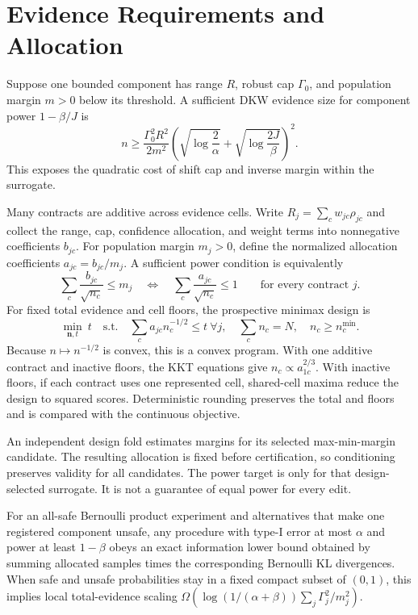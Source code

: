 \section{Evidence Requirements and Allocation}
\label{neurips:sec:allocation}

Suppose one bounded component has range $R$, robust cap $\Gamma_0$, and
population margin $m>0$ below its threshold. A sufficient DKW evidence size for
component power $1-\beta/J$ is
\begin{equation}
n\ge \frac{\Gamma_0^2R^2}{2m^2}
\left(\sqrt{\log\frac{2}{\alpha}}+
\sqrt{\log\frac{2J}{\beta}}\right)^2.
\label{neurips:eq:upper}
\end{equation}
This exposes the quadratic cost of shift cap and inverse margin within the
surrogate.

Many contracts are additive across evidence cells. Write
$R_j=\sum_c w_{jc}\rho_{jc}$ and collect the range, cap, confidence allocation,
and weight terms into nonnegative coefficients $b_{jc}$. For population margin
$m_j>0$, define the normalized allocation coefficients
$a_{jc}=b_{jc}/m_j$. A sufficient power condition is equivalently
\begin{equation}
\sum_c\frac{b_{jc}}{\sqrt{n_c}}\le m_j
\quad\Longleftrightarrow\quad
\sum_c\frac{a_{jc}}{\sqrt{n_c}}\le 1
\qquad\text{for every contract }j.
\label{neurips:eq:additive-power}
\end{equation}
For fixed total evidence and cell floors, the prospective minimax design is
\begin{equation}
\min_{\boldsymbol n,t}\ t
\quad\text{s.t.}\quad
\sum_c a_{jc}n_c^{-1/2}\le t\ \forall j,
\quad\sum_cn_c=N,
\quad n_c\ge n_c^{\min}.
\label{neurips:eq:convex}
\end{equation}
Because $n\mapsto n^{-1/2}$ is convex, this is a convex program. With one
additive contract and inactive floors, the KKT equations give
$n_c\propto a_{1c}^{2/3}$. With inactive floors, if each contract uses one
represented cell, shared-cell maxima reduce the design to squared scores.
Deterministic rounding preserves the total and floors and is compared with the
continuous objective.

An independent design fold estimates margins for its selected max-min-margin
candidate. The resulting allocation is fixed before certification, so
conditioning preserves validity for all candidates. The power target is only
for that design-selected surrogate. It is not a guarantee of equal power for
every edit.

\begin{theorem}
\label{neurips:thm:lower}
For an all-safe Bernoulli product experiment and alternatives that make one
registered component unsafe, any procedure with type-I error at most $\alpha$
and power at least $1-\beta$ obeys an exact information lower bound obtained by
summing allocated samples times the corresponding Bernoulli KL divergences.
When safe and unsafe probabilities stay in a fixed compact subset of $(0,1)$,
this implies local total-evidence scaling
$\Omega(\log(1/(\alpha+\beta))\sum_j\Gamma_j^2/m_j^2)$.
\end{theorem}

